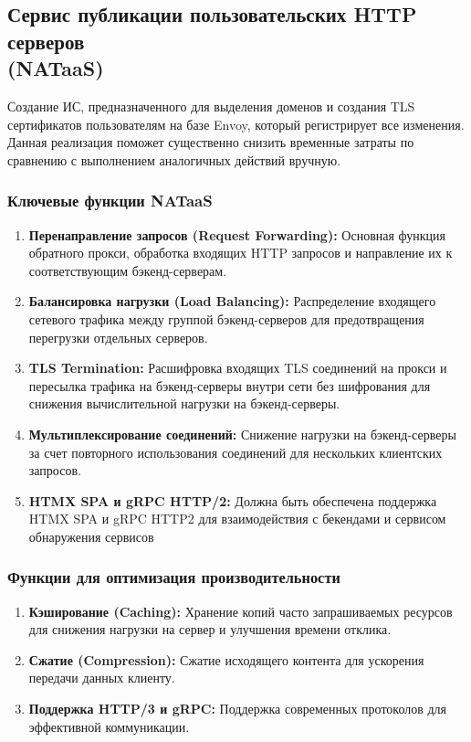 \documentclass[14pt, a4paper]{extarticle}
\begin{document}
\subsection{Сервис публикации пользовательских HTTP серверов \\(NATaaS)}

Создание ИС, предназначенного для выделения доменов и создания TLS сертификатов пользователям на базе Envoy, который регистрирует все изменения. Данная реализация  поможет существенно снизить временные затраты по сравнению с выполнением аналогичных действий вручную.

\subsubsection*{Ключевые функции NATaaS}

\begin{enumerate}
\item \textbf{Перенаправление запросов (Request Forwarding):} Основная функция обратного прокси, обработка входящих HTTP запросов и направление их к соответствующим бэкенд-серверам.
\item \textbf{Балансировка нагрузки (Load Balancing):} Распределение входящего сетевого трафика между группой бэкенд-серверов для предотвращения перегрузки отдельных серверов.
\item \textbf{TLS Termination:} Расшифровка входящих TLS соединений на прокси и пересылка трафика на бэкенд-серверы внутри сети без шифрования для снижения вычислительной нагрузки на бэкенд-серверы.
\item \textbf{Мультиплексирование соединений:} Снижение нагрузки на бэкенд-серверы за счет повторного использования соединений для нескольких клиентских запросов.
\item \textbf{HTMX SPA и gRPC HTTP/2:} Должна быть обеспечена поддержка HTMX SPA и gRPC HTTP2 для взаимодействия с бекендами и сервисом обнаружения сервисов
\end{enumerate}

\subsubsection*{Функции для оптимизация производительности}

\begin{enumerate}
\item \textbf{Кэширование (Caching):} Хранение копий часто запрашиваемых ресурсов для снижения нагрузки на сервер и улучшения времени отклика.
\item \textbf{Сжатие (Compression):} Сжатие исходящего контента для ускорения передачи данных клиенту.
\item \textbf{Поддержка HTTP/3 и gRPC:} Поддержка современных протоколов для эффективной коммуникации.
\end{enumerate}
\end{document}

